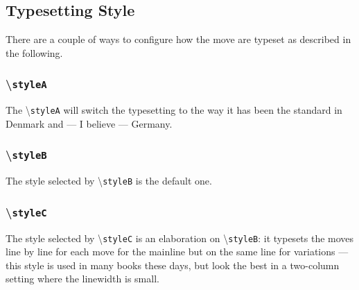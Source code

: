 \documentclass[10pt]{article}
\makeatletter
\renewcommand\showboard{\print@board}
\let\ORIshowboard\showboard
\renewcommand\showboard{%
    \makebox[8\squarelength]{%
    \rule{0pt}{9\squarelength}%
    \begin{postscript}%
    [trim = \squarelength{} 0pt \squarelength{} 0pt]
    \ORIshowboard
    \end{postscript}}}
\newcommand{\command}[1]{\textbackslash\texttt{#1}}
\makeatother
\begin{document}
\begin{LTXexample}

\mbox{}
\bigskip

\showboard



\end{LTXexample}


\subsection{Typesetting Style}
\label{sec:typesetting-style}

There are a couple of ways to configure how the move are typeset as
described in the following.


\subsubsection{\command{styleA}}
\label{sec:stylea}

The \command{styleA} will switch the typesetting to the way it has
been the standard in Denmark and --- I believe --- Germany.

\begin{LTXexample}
\newgame
\styleA

\end{LTXexample}


\subsubsection{\command{styleB}}
\label{sec:styleb}

The style selected by \command{styleB} is the default one.

\begin{LTXexample}
\newgame
\styleB

\end{LTXexample}


\subsubsection{\command{styleC}}
\label{sec:styleb}

The style selected by \command{styleC} is an elaboration on
\command{styleB}: it typesets the moves line by line for each move for
the mainline but on the same line for variations --- this style is
used in many books these days, but look the best in a two-column
setting where the linewidth is small.
\end{document}
